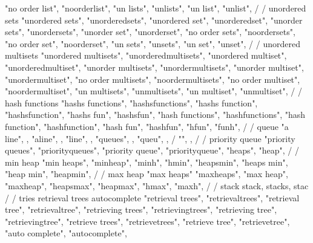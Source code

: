 {{{{{{        "no order list", 
        "noorderlist", 
        "un lists", 
        "unlists", 
        "un list", 
        "unlist", 
        /
        / unordered sets
        "unordered sets", 
        "unorderedsets", 
        "unordered set", 
        "unorderedset", 
        "unorder sets", 
        "unordersets", 
        "unorder set", 
        "unorderset", 
        "no order sets", 
        "noordersets", 
        "no order set", 
        "noorderset", 
        "un sets", 
        "unsets", 
        "un set", 
        "unset", 
        /
        / unordered multisets
        "unordered multisets", 
        "unorderedmultisets", 
        "unordered multiset", 
        "unorderedmultiset", 
        "unorder multisets", 
        "unordermultisets", 
        "unorder multiset", 
        "unordermultiset", 
        "no order multisets", 
        "noordermultisets", 
        "no order multiset", 
        "noordermultiset", 
        "un multisets", 
        "unmultisets", 
        "un multiset", 
        "unmultiset", 
        /
        / hash functions
        "hashs functions",  
        "hashsfunctions",  
        "hashs function",  
        "hashsfunction",  
        "hashs fun",  
        "hashsfun",  
        "hash functions",  
        "hashfunctions",  
        "hash function",  
        "hashfunction",  
        "hash fun",  
        "hashfun",  
        "hfun",  
        "funh",  
        /
        / queue 
        "a line", , 
        "aline", , 
        "line", , 
        "queues", , 
        "queu", , 
        / {"", ,
        /
        / priority queue 
        "priority queues",  
        "priorityqueues",  
        "priority queue",  
        "priorityqueue",  
        "heaps",  
        "heap",  
        /
        / min heap 
        "min heaps",
        "minheap", 
        "minh", 
        "hmin",
        "heapsmin",
        "heaps min",
        "heap min",
        "heapmin",
        /
        / max heap
        "max heaps"
        "maxheaps",
        "max heap",
        "maxheap", 
        "heapsmax",
        "heapmax", 
        "hmax",
        "maxh",
        /
        / stack
        stack, stacks, stac
        /
        / tries retrieval trees autocomplete 
        "retrieval trees",  
        "retrievaltrees",  
        "retrieval tree",  
        "retrievaltree",  
        "retrieving trees",  
        "retrievingtrees",  
        "retrieving tree",  
        "retrievingtree",  
        "retrieve trees",  
        "retrievetrees",  
        "retrieve tree",  
        "retrievetree",  
        "auto complete",  
        "autocomplete",  
}}}}}}}
